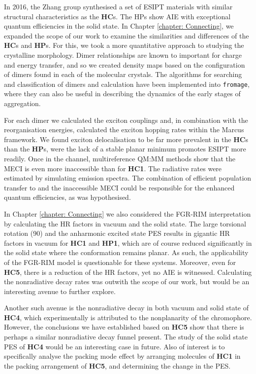In 2016, the Zhang group synthesised a set of ESIPT  materials with similar structural characteristics as the \textbf{HC}s. The \acp{HP} show AIE with exceptional quantum efficiencies in the solid state. In Chapter \ref{chapter: Connecting}, we expanded the scope of our work to examine the similarities and differences of the \textbf{HC}s and \textbf{HP}s. For this, we took a more quantitative approach to studying the crystalline morphology. Dimer relationships are known to important for charge and energy transfer, and so we created density maps based on the configuration of dimers found in each of the molecular crystals. The algorithms for searching and classification of dimers and calculation have been implemented into \texttt{fromage}, where they can also be useful in describing the dynamics of the early stages of aggregation. 

For each dimer we calculated the exciton couplings and, in combination with the reorganisation energies, calculated the exciton hopping rates within the Marcus framework. We found exciton delocalisation to be far more prevalent in the \textbf{HC}s than the \textbf{HP}s, were the lack of a stable planar \Estar{} minimum promotes ESIPT more readily. Once in the \Kstar{} channel, multireference QM:MM methods show that the MECI is even more inaccessible than for \textbf{HC1}. The radiative rates were estimated by simulating emission spectra. The combination of efficient population transfer to \Kstar{} and the inaccessible MECI could be responsible for the enhanced quantum efficiencies, as was hypothesised.  

In Chapter \ref{chapter: Connecting} we also considered the \ac{FGR-RIM} interpretation by calculating the \ac{HR} factors in vacuum and the solid state. The large torsional rotation (90\degree{}) and the anharmonic excited state \ac{PES} results in gigantic \ac{HR} factors in vacuum for \textbf{HC1} and \textbf{HP1}, which are of course reduced significantly in the solid state where the conformation remains planar. As such, the applicability of the \ac{FGR-RIM} model is questionable for these systems. Moreover, even for \textbf{HC5}, there is a reduction of the \ac{HR} factors, yet no AIE is witnessed. Calculating the nonradiative decay rates was outwith the scope of our work, but would be an interesting avenue to further explore.

Another such avenue is the nonradiative decay in both vacuum and solid state of \textbf{HC4}, which experimentally is attributed to the nonplanarity of the chromophore. However, the conclusions we have established based on \textbf{HC5} show that there is perhaps a similar nonradiative decay funnel present. The study of the solid state \ac{PES} of \textbf{HC4} would be an interesting case in future. Also of interest is to specifically analyse the packing mode effect by arranging molecules of \textbf{HC1} in the packing arrangement of \textbf{HC5}, and determining the change in the \ac{PES}. 


